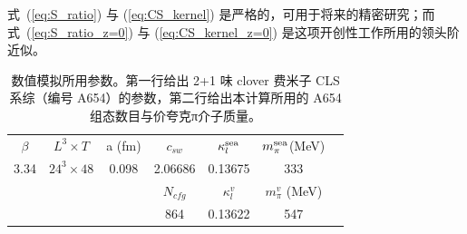式~(\ref{eq:S_ratio}) 与 (\ref{eq:CS_kernel}) 是严格的，可用于将来的精密研究；而式~(\ref{eq:S_ratio_z=0}) 与 (\ref{eq:CS_kernel_z=0}) 是这项开创性工作所用的领头阶近似。

\begin{table}[htbp]
\begin{center}
\caption{\label{table:cls} 数值模拟所用参数。第一行给出 2+1 味 clover 费米子 CLS 系综（编号 A654）的参数，第二行给出本计算所用的 A654 组态数目与价夸克π介子质量。}
\begin{tabular}{ccccccc}
\hline
 $\beta$ & $L^3\times T$  &a (fm)  & $c_{sw}$  & $\kappa^{\rm sea}_l$ & $m^{\rm sea}_{\pi} $(MeV)\\
  3.34 & $24^3 \times  48$ & 0.098 &  2.06686  & 0.13675 & 333 \\
\hline
&&& $N_{cfg}$  &  $\kappa^{v}_l$  & $m^v_{\pi} $ (MeV)  \\
  &&&  864  & 0.13622   & 547 \\
 \hline
\end{tabular}
\end{center}
\end{table}

